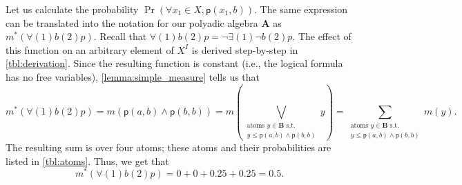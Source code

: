 \documentclass{article}
\theoremstyle{definition}
\theoremstyle{remark}
\begin{document}
Let us calculate the probability $\Pr(\forall x_1 \in X, \mathsf{p}(x_1, b))$.
The same expression can be translated into the notation for our polyadic algebra
$\mathbf{A}$ as $m^*(\bm\forall(1)b(2)p)$. Recall that $\bm\forall(1)b(2)p =
\neg\bm\exists(1)\neg b(2)p$. The effect of this function on an arbitrary
element of $X^I$ is derived step-by-step in \cref{tbl:derivation}. Since the
resulting function is constant (i.e., the logical formula has no free
variables), \cref{lemma:simple_measure} tells us that
\[
  m^*(\bm\forall(1)b(2)p) = m(\mathsf{p}(a, b) \land \mathsf{p}(b, b)) = m
  \left( \bigvee_{\substack{\text{atoms } y \in \mathbf{B} \text{ s.t.}\\
        y \le \mathsf{p}(a, b) \land \mathsf{p}(b, b)}} y \right) = \sum
  _{\substack{\text{atoms } y \in \mathbf{B} \text{ s.t.}\\
      y \le \mathsf{p}(a, b) \land \mathsf{p}(b, b)}} m(y).
\]
The resulting sum is over four atoms; these atoms and their probabilities are
listed in \cref{tbl:atoms}. Thus, we get that
\[
  m^*(\bm\forall(1)b(2)p) = 0 + 0 + 0.25 + 0.25 = 0.5.
\]




\end{document}
